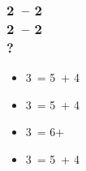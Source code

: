 \documentclass[12pt, a4paper]{article}
\begin{document}
\subsubsection*{2\clubs\ -- 2\diams \\ 
                2\spades\ -- 2\ntx \\
                ?}
\begin{itemize}
    \item 3\clubs\ = 5\spades\ + 4\diams
    \item 3\diams\ = 5\spades\ + 4\hearts
    \item 3\hearts\ = 6+\spades
    \item 3\spades\ = 5\spades\ + 4\clubs
\end{itemize}

\end{document}
